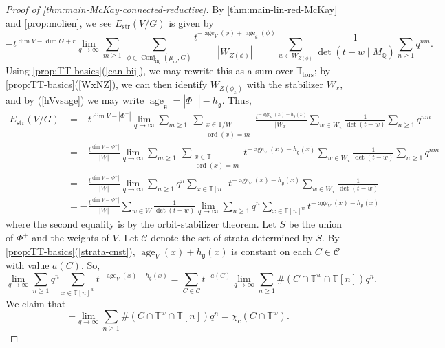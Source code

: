 \documentclass[12pt,a4paper]{amsart}
\theoremstyle{definition}
\newcommand{\TT}{\mathbb T}
\newcommand{\QQ}{\mathbb{Q}}
\newcommand{\cC}{\mathcal{C}}
\newcommand{\g}{\mathfrak{g}}
\newcommand{\str}{\mathrm{str}}
\renewcommand{\1}{\textbf{1}}
\newcommand{\<}{\langle}
\renewcommand{\>}{\rangle}
\DeclareMathOperator{\age}{age}
\DeclareMathOperator{\ord}{ord}
\DeclareMathOperator{\tors}{tors}
\DeclareMathOperator{\Conj}{Conj}
\DeclareMathOperator{\inj}{inj}
\begin{document}
	
	
	
\begin{proof}[{Proof of \autoref{thm:main-McKay-connected-reductive}}]
By \autoref{thm:main-lin-red-McKay} and \autoref{prop:molien}, we see $E_{\str}(V/G)$ is given by
\[
	-t^{\dim V-\dim G+r}\lim_{q\to\infty}\sum_{m\ge1}\ \sum_{\phi\in\Conj_{\inj}(\mu_m,G)} \frac{t^{-\age_V(\phi)+\age_{\g}(\phi)}}{|W_{Z(\phi)}|}\sum_{w\in W_{Z(\phi)}}\frac{1}{\det(t-w\mid  M_\QQ)}\sum_{n\ge1}q^{nm}.
\]
Using \autoref{prop:TT-basics}(\ref{can-bij}), we may rewrite this as a sum over $\TT_{\tors}$; by \autoref{prop:TT-basics}(\ref{WxNZ}), we can then identify $W_{Z(\phi_x)}$ with the stabilizer $W_x$, and by (\ref{hVvsage}) we may write $\age_\g=|\Phi^+|-h_\g$. Thus, 
\begin{align*}
	E_{\str}(V/G) &=-t^{\dim V-|\Phi^+|}\lim_{q\to\infty}\sum_{m\ge1}\ \sum_{\substack{x\in\TT/W\\\ord(x)=m}} \frac{t^{-\age_V(x)-h_\g(x)}}{|W_x|}\sum_{w\in W_x}\frac{1}{\det(t-w)}\sum_{n\ge1}q^{nm}\\
	&=-\frac{t^{\dim V-|\Phi^+|}}{|W|}\lim_{q\to\infty}\sum_{m\ge1}\ \sum_{\substack{x\in\TT\\\ord(x)=m}} t^{-\age_V(x)-h_\g(x)}\sum_{w\in W_x}\frac{1}{\det(t-w)}\sum_{n\ge1}q^{nm}\\
	&=-\frac{t^{\dim V-|\Phi^+|}}{|W|}\lim_{q\to\infty}\sum_{n\ge1}q^n \sum_{x\in\TT[n]} t^{-\age_V(x)-h_\g(x)}\sum_{w\in W_x}\frac{1}{\det(t-w)}\\
	&=-\frac{t^{\dim V-|\Phi^+|}}{|W|}\sum_{w\in W}\frac{1}{\det(t-w)}\lim_{q\to\infty}\sum_{n\ge1}q^n \sum_{x\in\TT[n]^w} t^{-\age_V(x)-h_\g(x)}
\end{align*}
where the second equality is by the orbit-stabilizer theorem. Let $S$ be the union of $\Phi^+$ and the weights of $V$. Let $\cC$ denote the set of strata determined by $S$. By \autoref{prop:TT-basics}(\ref{strata-cnst}), $\age_V(x)+h_\g(x)$ is constant on each $C\in\cC$ with value $a(C)$. So,
\[
	\lim_{q\to\infty}\sum_{n\ge1}q^n \sum_{x\in\TT[n]^w} t^{-\age_V(x)-h_\g(x)} =
		\sum_{C\in\cC}t^{-a(C)}\lim_{q\to\infty}\sum_{n\ge1}\#(C\cap\TT^w\cap\TT[n]) q^n.
\]
We claim that 
\begin{equation}\label{eqn:HLchi}
	-\lim_{q\to\infty}\sum_{n\ge1}\#(C\cap\TT^w\cap\TT[n]) q^n=\chi_c(C\cap\TT^w).
\end{equation}

\end{proof}
\end{document}
